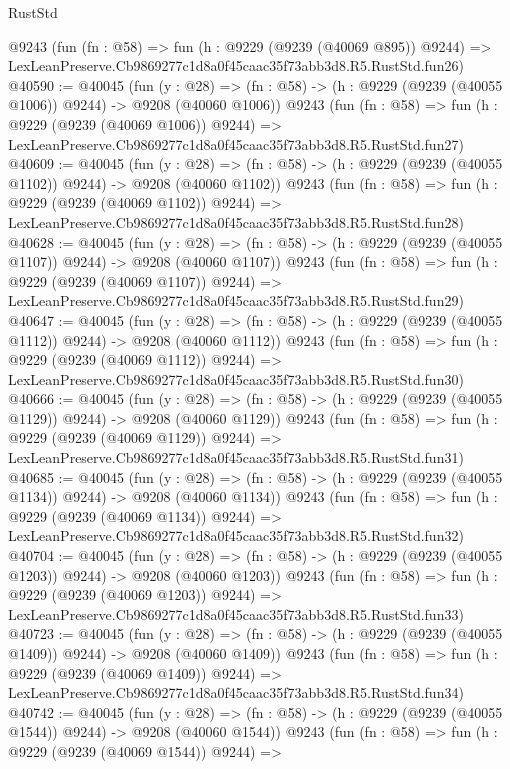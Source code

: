 \begin{lexlean}{RustStd}
\begin{coremodule}
    @9243
    (fun (fn : @58) =>
    fun (h : @9229 (@9239 (@40069 @895)) @9244) =>
    LexLeanPreserve.Cb9869277c1d8a0f45caac35f73abb3d8.R5.RustStd.fun26)
@40590 := @40045
    (fun (y : @28) =>
    (fn : @58) -> (h : @9229 (@9239 (@40055 @1006)) @9244) -> @9208 (@40060 @1006))
    @9243
    (fun (fn : @58) =>
    fun (h : @9229 (@9239 (@40069 @1006)) @9244) =>
    LexLeanPreserve.Cb9869277c1d8a0f45caac35f73abb3d8.R5.RustStd.fun27)
@40609 := @40045
    (fun (y : @28) =>
    (fn : @58) -> (h : @9229 (@9239 (@40055 @1102)) @9244) -> @9208 (@40060 @1102))
    @9243
    (fun (fn : @58) =>
    fun (h : @9229 (@9239 (@40069 @1102)) @9244) =>
    LexLeanPreserve.Cb9869277c1d8a0f45caac35f73abb3d8.R5.RustStd.fun28)
@40628 := @40045
    (fun (y : @28) =>
    (fn : @58) -> (h : @9229 (@9239 (@40055 @1107)) @9244) -> @9208 (@40060 @1107))
    @9243
    (fun (fn : @58) =>
    fun (h : @9229 (@9239 (@40069 @1107)) @9244) =>
    LexLeanPreserve.Cb9869277c1d8a0f45caac35f73abb3d8.R5.RustStd.fun29)
@40647 := @40045
    (fun (y : @28) =>
    (fn : @58) -> (h : @9229 (@9239 (@40055 @1112)) @9244) -> @9208 (@40060 @1112))
    @9243
    (fun (fn : @58) =>
    fun (h : @9229 (@9239 (@40069 @1112)) @9244) =>
    LexLeanPreserve.Cb9869277c1d8a0f45caac35f73abb3d8.R5.RustStd.fun30)
@40666 := @40045
    (fun (y : @28) =>
    (fn : @58) -> (h : @9229 (@9239 (@40055 @1129)) @9244) -> @9208 (@40060 @1129))
    @9243
    (fun (fn : @58) =>
    fun (h : @9229 (@9239 (@40069 @1129)) @9244) =>
    LexLeanPreserve.Cb9869277c1d8a0f45caac35f73abb3d8.R5.RustStd.fun31)
@40685 := @40045
    (fun (y : @28) =>
    (fn : @58) -> (h : @9229 (@9239 (@40055 @1134)) @9244) -> @9208 (@40060 @1134))
    @9243
    (fun (fn : @58) =>
    fun (h : @9229 (@9239 (@40069 @1134)) @9244) =>
    LexLeanPreserve.Cb9869277c1d8a0f45caac35f73abb3d8.R5.RustStd.fun32)
@40704 := @40045
    (fun (y : @28) =>
    (fn : @58) -> (h : @9229 (@9239 (@40055 @1203)) @9244) -> @9208 (@40060 @1203))
    @9243
    (fun (fn : @58) =>
    fun (h : @9229 (@9239 (@40069 @1203)) @9244) =>
    LexLeanPreserve.Cb9869277c1d8a0f45caac35f73abb3d8.R5.RustStd.fun33)
@40723 := @40045
    (fun (y : @28) =>
    (fn : @58) -> (h : @9229 (@9239 (@40055 @1409)) @9244) -> @9208 (@40060 @1409))
    @9243
    (fun (fn : @58) =>
    fun (h : @9229 (@9239 (@40069 @1409)) @9244) =>
    LexLeanPreserve.Cb9869277c1d8a0f45caac35f73abb3d8.R5.RustStd.fun34)
@40742 := @40045
    (fun (y : @28) =>
    (fn : @58) -> (h : @9229 (@9239 (@40055 @1544)) @9244) -> @9208 (@40060 @1544))
    @9243
    (fun (fn : @58) =>
    fun (h : @9229 (@9239 (@40069 @1544)) @9244) =>

\end{coremodule}
\end{lexlean}
